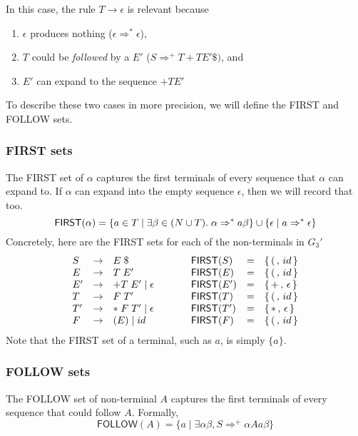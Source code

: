 In this case, the rule $T \to \epsilon$ is relevant because
\begin{enumerate}
    \item $\epsilon$ produces nothing ($\epsilon \Rightarrow^* \epsilon$),
    \item $T$ could be \textit{followed} by a $E'$ ($S \Rightarrow^+ T+TE'\$)$, and 
    \item $E'$ can expand to the sequence $+TE'$
\end{enumerate}

To describe these two cases in more precision, we will define the \textsf{FIRST} and \textsf{FOLLOW} sets.

\subsubsection{FIRST sets}
The \textsf{FIRST} set of $\alpha$ captures the first terminals of every sequence that $\alpha$ can expand to. If $\alpha$ can expand into the empty sequence $\epsilon$, then we will record that too.
\[\textsf{FIRST}(\alpha) = \{a \in T \mid \exists \beta \in (N\cup T)\* . \; \alpha \Rightarrow^{*} a\beta \} \cup \{\epsilon \mid a \Rightarrow^{*} \epsilon \}\]
Concretely, here are the \textsf{FIRST} sets for each of the non-terminals in $G_3'$
\[
\begin{array}{lllp{4ex}lll}
S  & \to & E\;\$                       && \textsf{FIRST}(S)  & = & \{\,(\,,\,id\,\}        \\
E  & \to & T\; E'                      && \textsf{FIRST}(E)  & = & \{\,(\,,\,id\,\}        \\
E' & \to & + T\; E' \mid \epsilon      && \textsf{FIRST}(E') & = & \{\,+\,,\, \epsilon\,\} \\
T  & \to & F \;T'                      && \textsf{FIRST}(T)  & = & \{\,(\,,\, id\,\}       \\
T' & \to & *\;F\; T' \mid \epsilon     && \textsf{FIRST}(T') & = & \{\,*\,,\, \epsilon\,\} \\
F  & \to & (E) \mid id                 && \textsf{FIRST}(F)  & = & \{\,(\,,\, id\,\}       \\
\end{array}
\]
Note that the \textsf{FIRST} set of a terminal, such as $a$, is simply $\{a\}$.

\subsubsection{FOLLOW sets}
The \textsf{FOLLOW} set of non-terminal $A$ captures the first terminals of every sequence that could follow $A$. Formally, 
\[
\textsf{FOLLOW}(A) = \{ a \mid \exists \alpha \beta, S \Rightarrow^+ \alpha A a \beta \}
\]

